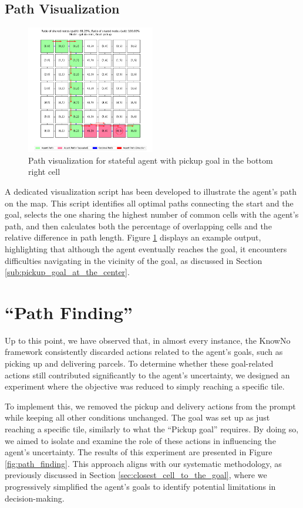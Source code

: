 \subsection{Path Visualization}
\begin{figure}[h]
  \centering
  \includegraphics[width=0.5\textwidth]{
    images/results_discussion/stateful/pickupBR_7x7.png
  }
  \caption{Path visualization for stateful agent with pickup goal in the bottom
  right cell}
  \label{fig:stateful_path}
\end{figure}

A dedicated visualization script has been developed to illustrate the agent's
path on the map. This script identifies all optimal paths connecting the start and
the goal, selects the one sharing the highest number of common cells with the
agent's path, and then calculates both the percentage of overlapping cells and the
relative difference in path length. Figure \ref{fig:stateful_path} displays an
example output, highlighting that although the agent eventually reaches the goal,
it encounters difficulties navigating in the vicinity of the goal, as discussed in
Section \ref{sub:pickup_goal_at_the_center}.

\section{``Path Finding''}

Up to this point, we have observed that, in almost every instance, the KnowNo framework
consistently discarded actions related to the agent's goals, such as picking up
and delivering parcels. To determine whether these goal-related actions still contributed
significantly to the agent's uncertainty, we designed an experiment where the
objective was reduced to simply reaching a specific tile.

To implement this, we removed the pickup and delivery actions from the prompt while
keeping all other conditions unchanged. The goal was set up as just reaching a
specific tile, similarly to what the ``Pickup goal'' requires. By doing so, we aimed
to isolate and examine the role of these actions in influencing the agent's uncertainty.
The results of this experiment are presented in Figure \ref{fig:path_finding}. This
approach aligns with our systematic methodology, as previously discussed in
Section \ref{sec:closest_cell_to_the_goal}, where we progressively simplified the
agent's goals to identify potential limitations in decision-making.

